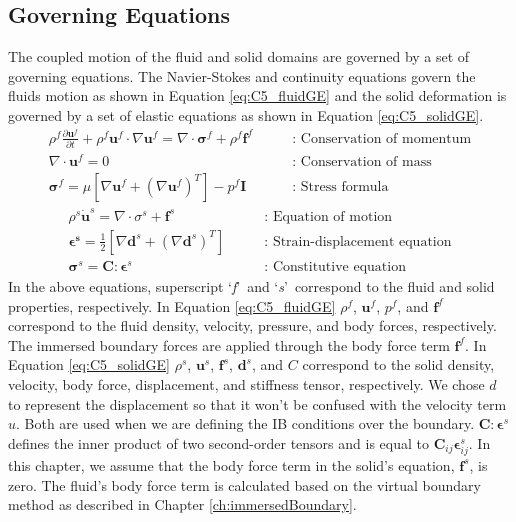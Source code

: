 \subsection{Governing Equations}
The coupled motion of the fluid and solid domains are governed by a set of governing equations. The Navier-Stokes and continuity equations govern the fluids motion as shown in Equation \eqref{eq:C5_fluidGE} and the solid deformation is governed by a set of elastic equations as shown in Equation \eqref{eq:C5_solidGE}.
%
\begin{subequations}\label{eq:C5_fluidGE}
\begin{align}
	\rho^f \frac{\partial \mathbf{u}^f}{\partial t} + 
	\rho^f \mathbf{u}^f \cdot \nabla \mathbf{u}^f = 
	\nabla \cdot \mathbf{\sigma}^f +
	\rho^f \mathbf{f}^f
	\quad \quad &\text{: Conservation of momentum}
	\\
	\nabla \cdot \mathbf{u}^f = 0
	\quad \quad &\text{: Conservation of mass}
	\\
	\mathbf{\sigma}^f = 
	\mu \left[ \nabla \mathbf{u}^f + \left( \nabla \mathbf{u}^f \right)^T \right] - 
	p^f \mathbf{I}
	\quad \quad &\text{: Stress formula}
\end{align}
\end{subequations}
%
\begin{subequations}\label{eq:C5_solidGE}
\begin{align}
	\rho^s \dot{\mathbf{u}}^s = 
	\nabla \cdot \sigma^s + \mathbf{f}^s
	\quad \quad &\text{: Equation of motion}
	\\
	\mathbf{\epsilon^s} = \frac{1}{2}
	                                 \left[ \nabla \mathbf{d}^s + \left( \nabla \mathbf{d}^s \right)^T \right]
	\quad \quad &\text{: Strain-displacement equation}
	\\
	\mathbf{\sigma}^s = \mathbf{C} : \mathbf{\epsilon}^s
	\quad \quad &\text{: Constitutive equation}
\end{align}
\end{subequations}
%
In the above equations, superscript \lq\emph{f}\rq\ and \lq\emph{s}\rq\ correspond to the fluid and solid properties, respectively. In Equation \eqref{eq:C5_fluidGE} $\rho^f$, $\mathbf{u}^f$, $p^f$, and $\mathbf{f}^f$ correspond to the fluid density, velocity, pressure, and body forces, respectively. The immersed boundary forces are applied through the body force term $\mathbf{f}^f$. In Equation \eqref{eq:C5_solidGE} $\rho^s$, $\mathbf{u}^s$, $\mathbf{f}^s$, $\mathbf{d}^s$, and $C$ correspond to the solid density, velocity, body force, displacement, and stiffness tensor, respectively. We chose $d$ to represent the displacement so that it won't be confused with the velocity term $u$. Both are used when we are defining the IB conditions over the boundary. $\mathbf{C} : \mathbf{\epsilon}^s$ defines the inner product of two second-order tensors and is equal to $\mathbf{C}_{ij} \mathbf{\epsilon}_{ij}^s$. In this chapter, we assume that the body force term in the solid's equation, $\mathbf{f}^s$, is zero. The fluid's body force term is calculated based on the virtual boundary method as described in Chapter \ref{ch:immersedBoundary}.

